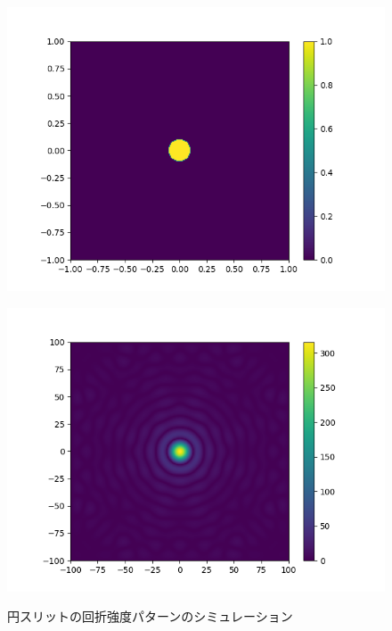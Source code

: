 \begin{figure}[htbp]
	\begin{minipage}[ht]{0.48\hsize}\centering
		\includegraphics[width=\linewidth]{src/figures/result/circle2_original_estimation.png}
		\label{subfig:amplitude_sim_circle2_original}
	\end{minipage}
	\begin{minipage}[ht]{0.48\hsize}\centering
		\includegraphics[width=\linewidth]{src/figures/result/circle2_amplitude_estimation.png}
		\label{subfig:amplitude_sim_circle2}
	\end{minipage}
	\caption{円スリットの回折強度パターンのシミュレーション}\label{fig:amplitude_sim_circle}
\end{figure}

